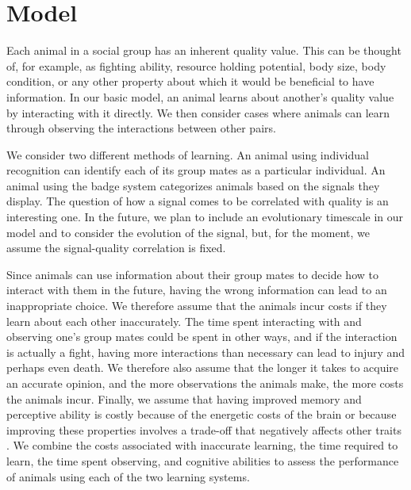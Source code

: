 \section*{Model} 
Each animal in a social group has an inherent quality value. This can be thought of, for example, as fighting ability, resource holding potential, body size, body condition, or any other property about which it would be beneficial to have information. In our basic model, an animal learns about another's quality value by interacting with it directly. We then consider cases where animals can learn through observing the interactions between other pairs. 

We consider two different methods of learning. An animal using individual recognition can identify each of its group mates as a particular individual. An animal using the badge system categorizes animals based on the signals they display. The question of how a signal comes to be correlated with quality is an interesting one. In the future, we plan to include an evolutionary timescale in our model and to consider the evolution of the signal, but, for the moment, we assume the signal-quality correlation is fixed.

Since animals can use information about their group mates to decide how to interact with them in the future, having the wrong information can lead to an inappropriate choice. We therefore assume that the animals incur costs if they learn about each other inaccurately. The time spent interacting with and observing one's group mates could be spent in other ways, and if the interaction is actually a fight, having more interactions than necessary can lead to injury and perhaps even death.  We therefore also assume that the longer it takes to acquire an accurate opinion, and the more observations the animals make, the more costs the animals incur. Finally, we assume that having improved memory and perceptive ability is costly because of the energetic costs of the brain \citep{Dunbar:1992ys,Laughlin:1998ly,Laughlin:2001qf} or because improving these properties involves a trade-off that negatively affects other traits \citep{MacIver:2010ve}. We combine the costs associated with inaccurate learning, the time required to learn, the time spent observing, and cognitive abilities to assess the performance of animals using each of the two learning systems.  

